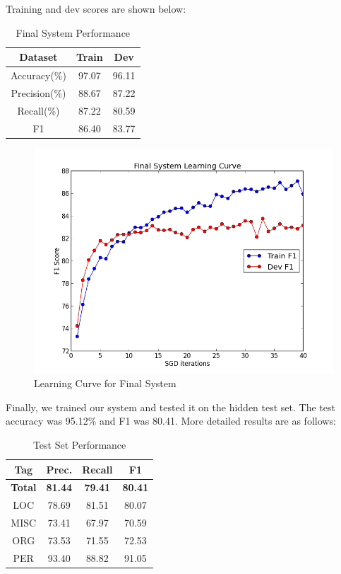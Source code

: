 \documentclass[12pt, twocolumn]{article}
\begin{document}
Training and dev scores are shown below:
\begin{table}[H]
\centering
	\begin{tabular}{|c|c|c|}
		\hline
		Dataset & Train & Dev \\\hline
		Accuracy(\%) & 97.07 & 96.11 \\\hline
		Precision(\%) & 88.67 & 87.22 \\\hline
		Recall(\%)  & 87.22 & 80.59 \\\hline
		F1 & 86.40 & 83.77 \\\hline
	\end{tabular}
	\caption{Final System Performance}
\label{tab:result}
\end{table}
\begin{figure}[H]
\centering
\includegraphics[width = \linewidth]{plots/result}
\caption{Learning Curve for Final System}
\label{fig:result}
\end{figure}
Finally, we trained our system and tested it on the hidden test set. The test accuracy was 95.12\% and F1 was 80.41. More detailed results are as follows:
\begin{table}[H]
\centering
	\begin{tabular}{|c|c|c|c|}
		\hline
		Tag & Prec. & Recall & F1 \\\hline
		\textbf{Total} & \textbf{81.44} & \textbf{79.41} & \textbf{80.41}\\\hline
		LOC & 78.69 & 81.51 & 80.07 \\\hline
		MISC & 73.41 & 67.97 & 70.59 \\\hline
		ORG  & 73.53 & 71.55 & 72.53 \\\hline
		PER & 93.40 & 88.82 & 91.05 \\\hline
	\end{tabular}
	\caption{Test Set Performance}
\label{tab:test}
\end{table}
\end{document}
